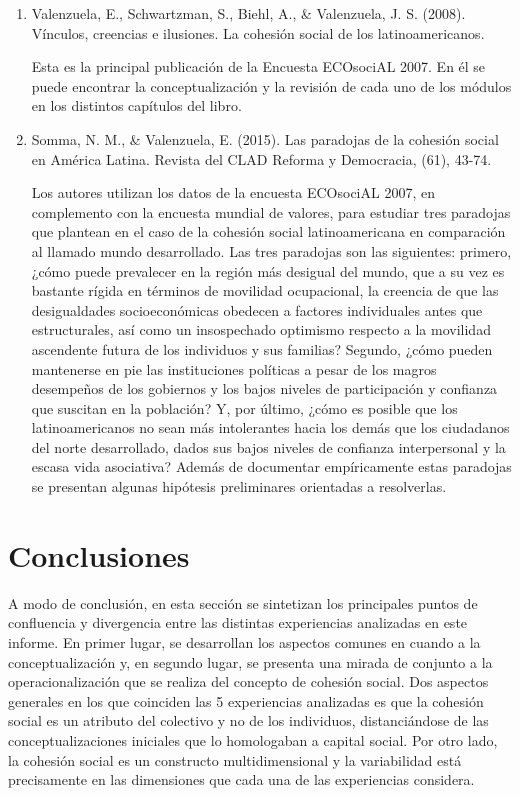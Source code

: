 \documentclass[
  12pt,
]{book}
\begin{document}
\begin{enumerate}
\def\labelenumi{\arabic{enumi}.}
\item
  Valenzuela, E., Schwartzman, S., Biehl, A., \& Valenzuela, J. S.
  (2008). Vínculos, creencias e ilusiones. La cohesión social de los
  latinoamericanos.

  Esta es la principal publicación de la Encuesta ECOsociAL 2007. En
  él se puede encontrar la conceptualización y la revisión de cada uno
  de los módulos en los distintos capítulos del libro.\\
\item
  Somma, N. M., \& Valenzuela, E. (2015). Las paradojas de la cohesión
  social en América Latina. Revista del CLAD Reforma y Democracia,
  (61), 43-74.

  Los autores utilizan los datos de la encuesta ECOsociAL 2007, en
  complemento con la encuesta mundial de valores, para estudiar tres
  paradojas que plantean en el caso de la cohesión social
  latinoamericana en comparación al llamado mundo desarrollado. Las
  tres paradojas son las siguientes: primero, ¿cómo puede prevalecer
  en la región más desigual del mundo, que a su vez es bastante rígida
  en términos de movilidad ocupacional, la creencia de que las
  desigualdades socioeconómicas obedecen a factores individuales antes
  que estructurales, así como un insospechado optimismo respecto a la
  movilidad ascendente futura de los individuos y sus familias?
  Segundo, ¿cómo pueden mantenerse en pie las instituciones políticas
  a pesar de los magros desempeños de los gobiernos y los bajos
  niveles de participación y confianza que suscitan en la población?
  Y, por último, ¿cómo es posible que los latinoamericanos no sean más
  intolerantes hacia los demás que los ciudadanos del norte
  desarrollado, dados sus bajos niveles de confianza interpersonal y
  la escasa vida asociativa? Además de documentar empíricamente estas
  paradojas se presentan algunas hipótesis preliminares orientadas a
  resolverlas.
\end{enumerate}

\hypertarget{conclusiones}{%
\chapter{Conclusiones}\label{conclusiones}}

A modo de conclusión, en esta sección se sintetizan los principales
puntos de confluencia y divergencia entre las distintas experiencias
analizadas en este informe. En primer lugar, se desarrollan los aspectos
comunes en cuando a la conceptualización y, en segundo lugar, se
presenta una mirada de conjunto a la operacionalización que se realiza
del concepto de cohesión social. Dos aspectos generales en los que
coinciden las 5 experiencias analizadas es que la cohesión social es un
atributo del colectivo y no de los individuos, distanciándose de las
conceptualizaciones iniciales que lo homologaban a capital social. Por
otro lado, la cohesión social es un constructo multidimensional y la
variabilidad está precisamente en las dimensiones que cada una de las
experiencias considera.
\end{document}
